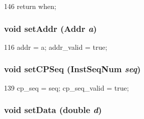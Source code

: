 \begin{DoxyCode}
146 { return when; }
\end{DoxyCode}
\hypertarget{classTrace_1_1InstRecord_a0086c298c7423d3f7e571e9f63a1c09f}{
\subsubsection[{setAddr}]{\setlength{\rightskip}{0pt plus 5cm}void setAddr ({\bf Addr} {\em a})}}
\label{classTrace_1_1InstRecord_a0086c298c7423d3f7e571e9f63a1c09f}



\begin{DoxyCode}
116 { addr = a; addr_valid = true; }
\end{DoxyCode}
\hypertarget{classTrace_1_1InstRecord_a6509e37b7ec23ed19556f37f235d8590}{
\subsubsection[{setCPSeq}]{\setlength{\rightskip}{0pt plus 5cm}void setCPSeq ({\bf InstSeqNum} {\em seq})}}
\label{classTrace_1_1InstRecord_a6509e37b7ec23ed19556f37f235d8590}



\begin{DoxyCode}
139     { cp_seq = seq; cp_seq_valid = true; }
\end{DoxyCode}
\hypertarget{classTrace_1_1InstRecord_a2abd4d7259938c86cfd9bd95f55f1c9f}{
\subsubsection[{setData}]{\setlength{\rightskip}{0pt plus 5cm}void setData (double {\em d})}}
\label{classTrace_1_1InstRecord_a2abd4d7259938c86cfd9bd95f55f1c9f}



